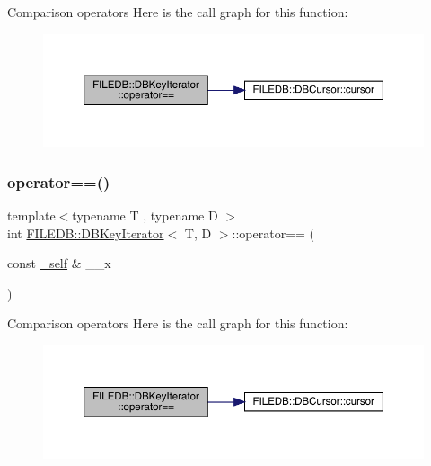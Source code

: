 Comparison operators Here is the call graph for this function\+:
\nopagebreak
\begin{figure}[H]
\begin{center}
\leavevmode
\includegraphics[width=350pt]{d4/d89/classFILEDB_1_1DBKeyIterator_ab6d1aad1d07c4ee9a1edeadf6610c6f4_cgraph}
\end{center}
\end{figure}
\mbox{\label{classFILEDB_1_1DBKeyIterator_ab6d1aad1d07c4ee9a1edeadf6610c6f4}} 
\subsubsection{\texorpdfstring{operator==()}{operator==()}\hspace{0.1cm}{\footnotesize\ttfamily [2/3]}}
{\footnotesize\ttfamily template$<$typename T , typename D $>$ \\
int \mbox{\hyperlink{classFILEDB_1_1DBKeyIterator}{F\+I\+L\+E\+D\+B\+::\+D\+B\+Key\+Iterator}}$<$ T, D $>$\+::operator== (\begin{DoxyParamCaption}\item[{const \mbox{\hyperlink{classFILEDB_1_1DBKeyIterator_aaf7773c7a848ec6e04bc738dd794ace1}{\+\_\+self}} \&}]{\+\_\+\+\_\+x }\end{DoxyParamCaption})\hspace{0.3cm}{\ttfamily [inline]}}

Comparison operators Here is the call graph for this function\+:
\nopagebreak
\begin{figure}[H]
\begin{center}
\leavevmode
\includegraphics[width=350pt]{d4/d89/classFILEDB_1_1DBKeyIterator_ab6d1aad1d07c4ee9a1edeadf6610c6f4_cgraph}
\end{center}
\end{figure}
\mbox{\label{classFILEDB_1_1DBKeyIterator_ab6d1aad1d07c4ee9a1edeadf6610c6f4}} 
